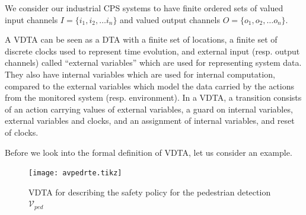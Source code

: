 We consider our industrial \ac{CPS} systems to have finite ordered sets of valued input channels ${I} = \{{i_1}, {i_2}, \ldots {i_n}\}$ and valued output channels ${O} = \{{o_1}, {o_2}, \ldots {o_n}\}$.

A VDTA can be seen as a DTA with a finite set of locations, a finite set of discrete clocks used to represent time evolution, and external input (resp. output channels) called ``external variables'' which are used for representing system data.
They also have internal variables which are used for internal computation, compared to the external variables which model the data carried by the actions from the monitored system (resp. environment). 
In a VDTA, a transition consists of an action carrying values of external variables, a guard on internal variables, external variables and clocks, and an assignment of internal variables, and reset of clocks.

Before we look into the formal definition of VDTA, let us consider an example.

\begin{figure}[H]
	\centering
	\texttt{[image: avpedrte.tikz]}
	\caption{\ac{VDTA} for describing the safety policy for the pedestrian detection $\mathcal{V}_{ped}$\label{fig:avpedrte}}
\end{figure}

